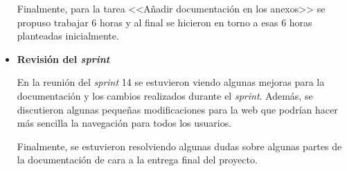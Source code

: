 \begin{itemize}
Finalmente, para la tarea <<Añadir documentación en los anexos>> se propuso trabajar 6 horas y al final se hicieron en torno a esas 6 horas planteadas inicialmente.

\item\textbf{Revisión del \textit{sprint}}

En la reunión del \textit{sprint} 14 se estuvieron viendo algunas mejoras para la documentación y los cambios realizados durante el \textit{sprint}.
Además, se discutieron algunas pequeñas modificaciones para la web que podrían hacer más sencilla la navegación para todos los usuarios.

Finalmente, se estuvieron resolviendo algunas dudas sobre algunas partes de la documentación de cara a la entrega final del proyecto.
\end{itemize}

